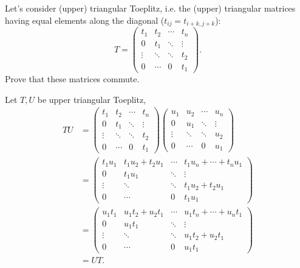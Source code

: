 Let's consider (upper) triangular Toeplitz,
i.e. the (upper) triangular matrices having equal elements
 along the diagonal ($t_{ij} = t_{i+k,j+k}$):
\[
  T =
  \begin{pmatrix}
    t_1 & t_2 & \cdots & t_n\\
    0   & t_1 & \ddots & \vdots\\
    \vdots & \ddots & \ddots & t_2\\
    0 & \cdots & 0 & t_1
  \end{pmatrix}.
\]
Prove that these matrices commute.

\begin{solution}
  Let $T,U$ be upper triangular Toeplitz,
  \begin{align*}
    TU
    & =
    \begin{pmatrix}
      t_1 & t_2 & \cdots & t_n\\
      0   & t_1 & \ddots & \vdots\\
      \vdots & \ddots & \ddots & t_2\\
      0 & \cdots & 0 & t_1
    \end{pmatrix}
    \begin{pmatrix}
      u_1 & u_2 & \cdots & u_n\\
      0   & u_1 & \ddots & \vdots\\
      \vdots & \ddots & \ddots & u_2\\
      0 & \cdots & 0 & u_1
    \end{pmatrix}\\
    & =
    \begin{pmatrix}
      t_1u_1 & t_1u_2 + t_2u_1 & \cdots & t_1u_n + \cdots + t_nu_1\\
      0   & t_1u_1 & \ddots & \vdots\\
      \vdots & \ddots & \ddots & t_1u_2 + t_2u_1\\
      0 & \cdots & 0 & t_1u_1
    \end{pmatrix}\\
    & =
    \begin{pmatrix}
      u_1t_1 & u_1t_2 + u_2t_1 & \cdots & u_1t_n + \cdots + u_nt_1\\
      0   & u_1t_1 & \ddots & \vdots\\
      \vdots & \ddots & \ddots & u_1t_2 + u_2t_1\\
      0 & \cdots & 0 & u_1t_1
    \end{pmatrix}\\
    & = UT.
  \end{align*}
\end{solution}

